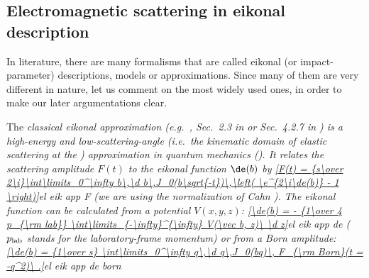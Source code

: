 
\subsection[em sc eik]{Electromagnetic scattering in eikonal description}

In literature, there are many formalisms that are called eikonal (or impact-parameter) descriptions, models or approximations. Since many of them are very different in nature, let us comment on the most widely used ones, in order to make our later argumentations clear.

The \em{classical eikonal approximation} (e.g.~, Sec.~2.3 in  or Sec.~4.2.7 in ) is a high-energy and low-scattering-angle (i.e.~the kinematic domain of elastic scattering at the ) approximation in quantum mechanics (). It relates the scattering amplitude $F(t)$ to the eikonal function $\de(b)$ by
\eqref{F(t) = {s\over 2\i}\int\limits_0^\infty b\,\d b\,J_0(b\sqrt{-t})\,\left( \e^{2\i\de(b)} - 1 \right)}{el eik app F}
(we are using the normalization of Cahn ). The \em{eikonal} function can be calculated from a potential $V(x, y, z)$:
\eqref{\de(b) = - {1\over 4 p_{\rm lab}} \int\limits_{-\infty}^{\infty} V(\vec b, z)\ \d z}{el eik app de}
($p_{\rm lab}$ stands for the laboratory-frame momentum) or from a Born amplitude:
\eqref{\de(b) = {1\over s} \int\limits_0^\infty q\,\d q\,J_0(bq)\, F_{\rm Born}(t = -q^2)\ .}{el eik app de born}

